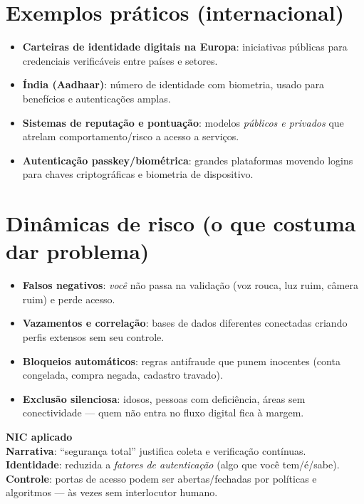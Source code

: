 \section{Exemplos práticos (internacional)}
\begin{itemize}[leftmargin=*,noitemsep]
  \item \textbf{Carteiras de identidade digitais na Europa}: iniciativas públicas para credenciais verificáveis entre países e setores.
  \item \textbf{Índia (Aadhaar)}: número de identidade com biometria, usado para benefícios e autenticações amplas.
  \item \textbf{Sistemas de reputação e pontuação}: modelos \emph{públicos e privados} que atrelam comportamento/risco a acesso a serviços.
  \item \textbf{Autenticação passkey/biométrica}: grandes plataformas movendo logins para chaves criptográficas e biometria de dispositivo.
\end{itemize}

\section{Dinâmicas de risco (o que costuma dar problema)}
\begin{itemize}[leftmargin=*,noitemsep]
  \item \textbf{Falsos negativos}: \emph{você} não passa na validação (voz rouca, luz ruim, câmera ruim) e perde acesso.
  \item \textbf{Vazamentos e correlação}: bases de dados diferentes conectadas criando perfis extensos sem seu controle.
  \item \textbf{Bloqueios automáticos}: regras antifraude que punem inocentes (conta congelada, compra negada, cadastro travado).
  \item \textbf{Exclusão silenciosa}: idosos, pessoas com deficiência, áreas sem conectividade --- quem não entra no fluxo digital fica à margem.
\end{itemize}

\begin{nicbox}
\textbf{NIC aplicado}\\
\textbf{Narrativa}: ``segurança total'' justifica coleta e verificação contínuas.\\
\textbf{Identidade}: reduzida a \emph{fatores de autenticação} (algo que você tem/é/sabe).\\
\textbf{Controle}: portas de acesso podem ser abertas/fechadas por políticas e algoritmos --- às vezes sem interlocutor humano.
\end{nicbox}

